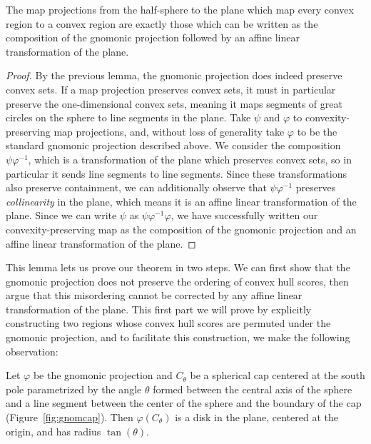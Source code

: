 \begin{lemma}
	The map projections from the half-sphere to the plane which map every convex region to a convex region are exactly those which can be written as the composition of the gnomonic projection followed by an affine linear transformation of the plane.
\end{lemma}

\begin{proof}
	By the previous lemma, the gnomonic projection does indeed preserve convex sets.   If a map projection preserves convex sets, it must in particular preserve the one-dimensional convex sets, meaning it maps segments of great circles on the sphere to line segments in the plane.  Take $\psi$ and $\varphi$ to convexity-preserving map projections, and, without loss of generality take $\varphi$ to be the standard gnomonic projection described above. We consider the composition $\psi\varphi^{-1}$, which is a transformation of the plane which preserves convex sets, so in particular it sends line segments to line segments.  Since these transformations also preserve containment, we can additionally observe that $\psi\varphi^{-1}$ preserves \textit{collinearity} in the plane, which means it is an affine linear transformation of the plane.  Since we can write $\psi$ as $\psi\varphi^{-1}\varphi$, we have successfully written our convexity-preserving map as the composition of the gnomonic projection and an affine linear transformation of the plane.
\end{proof}

This lemma lets us prove our theorem in two steps.  We can first show that the gnomonic projection does not preserve the ordering of convex hull scores, then argue that this misordering cannot be corrected by any affine linear transformation of the plane.  This first part we will prove by explicitly constructing two regions whose convex hull scores are permuted under the gnomonic projection, and to facilitate this construction, we make the following observation:

\begin{lemma}
Let $\varphi$ be the gnomonic projection and $C_\theta$ be a spherical cap centered at the south pole parametrized by the angle $\theta$ formed between the central axis of the sphere and a line segment between the center of the sphere and the boundary of the cap (Figure~\ref{fig:gnomcap}).  Then $\varphi(C_\theta)$ is a disk in the plane, centered at the origin, and has radius $\tan(\theta)$.
\end{lemma}

